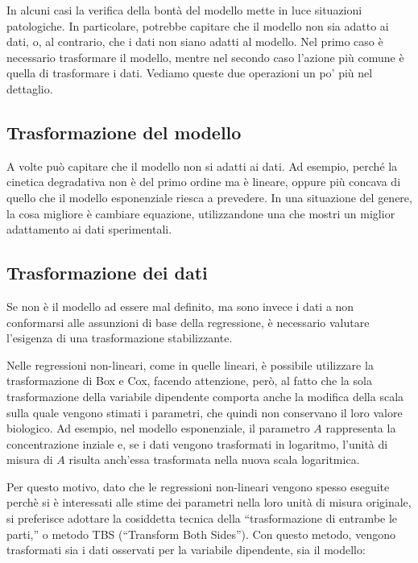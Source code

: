 \documentclass[a4paper,12pt,oneside]{book}
\begin{document}
In alcuni casi la verifica della bontà del modello mette in luce situazioni patologiche. In particolare, potrebbe capitare che il modello non sia adatto ai dati, o, al contrario, che i dati non siano adatti al modello. Nel primo caso è necessario trasformare il modello, mentre nel secondo caso l'azione più comune è quella di trasformare i dati. Vediamo queste due operazioni un po' più nel dettaglio.

\hypertarget{trasformazione-del-modello}{%
\subsection{Trasformazione del modello}\label{trasformazione-del-modello}}

A volte può capitare che il modello non si adatti ai dati. Ad esempio, perché la cinetica degradativa non è del primo ordine ma è lineare, oppure più concava di quello che il modello esponenziale riesca a prevedere. In una situazione del genere, la cosa migliore è cambiare equazione, utilizzandone una che mostri un miglior adattamento ai dati sperimentali.

\hypertarget{trasformazione-dei-dati}{%
\subsection{Trasformazione dei dati}\label{trasformazione-dei-dati}}

Se non è il modello ad essere mal definito, ma sono invece i dati a non conformarsi alle assunzioni di base della regressione, è necessario valutare l'esigenza di una trasformazione stabilizzante.

Nelle regressioni non-lineari, come in quelle lineari, è possibile utilizzare la trasformazione di Box e Cox, facendo attenzione, però, al fatto che la sola trasformazione della variabile dipendente comporta anche la modifica della scala sulla quale vengono stimati i parametri, che quindi non conservano il loro valore biologico. Ad esempio, nel modello esponenziale, il parametro \(A\) rappresenta la concentrazione inziale e, se i dati vengono trasformati in logaritmo, l'unità di misura di \(A\) risulta anch'essa trasformata nella nuova scala logaritmica.

Per questo motivo, dato che le regressioni non-lineari vengono spesso eseguite perchè si è interessati alle stime dei parametri nella loro unità di misura originale, si preferisce adottare la cosiddetta tecnica della ``trasformazione di entrambe le parti,'' o metodo TBS (``Transform Both Sides''). Con questo metodo, vengono trasformati sia i dati osservati per la variabile dipendente, sia il modello:
\end{document}
